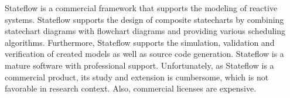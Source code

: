 \documentclass[conference]{IEEEtran}
\newcommand{\Yakindu}{\textsf{Yakindu}}
\begin{document}
Stateflow \cite{stateflow} is a commercial framework that supports the modeling of
reactive systems. Stateflow supports the design of composite
statecharts by combining
statechart diagrams with flowchart diagrams and providing various scheduling
algorithms. Furthermore, Stateflow supports the simulation, validation and verification of created models as well as source code generation. Stateflow is a mature software with professional
support. Unfortunately, as Stateflow is a commercial product, its study and extension is cumbersome, which is not favorable in research context. Also, commercial licenses are expensive.


%
%
%
%
\end{document}
